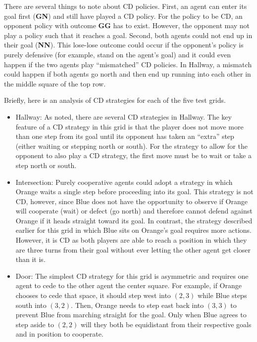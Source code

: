 \documentclass[letterpaper]{article}
\begin{document}
There are several things to note about CD policies. First, an agent
can enter its goal first ({\bf GN}) and still have played a CD
policy. For the policy to be CD, an opponent policy with outcome {\bf
GG} has to exist. However, the opponent may not play a policy such
that it reaches a goal. Second, both agents could not end up in their goal
({\bf NN}). This lose-lose outcome could occur if the opponent's
policy is purely defensive (for example, stand on the agent's goal)
and it could even happen if the two agents play ``mismatched'' CD
policies. In Hallway, a mismatch could happen if both agents go north
and then end up running into each other in the middle square of the
top row.
 
Briefly, here is an analysis of CD strategies for each of the five
test grids.

\begin{itemize}

\item{Hallway}: As noted, there are several CD strategies in
Hallway. The key feature of a CD strategy in this grid is that the
player does not move more than one step from its goal until its
opponent has taken an ``extra'' step (either waiting or stepping north
or south). For the strategy to allow for the opponent to also play a
CD strategy, the first move must be to wait or take a step north or
south.

\item{Intersection}: Purely cooperative agents could adopt a strategy
in which Orange waits a single step before proceeding into its
goal. This strategy is not CD, however, since Blue does not have the
opportunity to observe if Orange will cooperate (wait) or defect (go
north) and therefore cannot defend against Orange if it heads straight
toward its goal. In contrast, the strategy described earlier for this
grid in which Blue sits on Orange's goal requires more
actions. However, it is CD as both players are able to reach a
position in which they are three turns from their goal without ever
letting the other agent get closer than it is.

\item{Door}: The simplest CD strategy for this grid is asymmetric and
requires one agent to cede to the other agent the center square. For
example, if Orange chooses to cede that space, it should step west
into $(2,3)$ while Blue steps south into $(3,2)$. Then, Orange needs
to step east back into $(3,3)$ to prevent Blue from marching straight
for the goal. Only when Blue agrees to step aside to $(2,2)$ will they
both be equidistant from their respective goals and in position to
cooperate.


\end{itemize}
\end{document}

